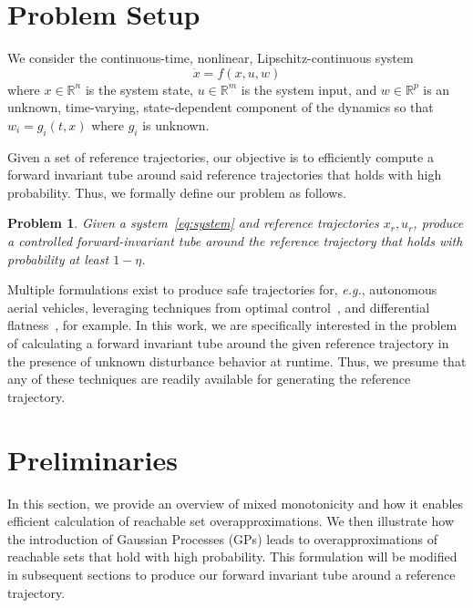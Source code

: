 \documentclass[preprint,12pt]{elsarticle}
\newcommand{\ul}{\underline}
\newtheorem{problem}{Problem}
\newcommand{\ol}{\overline}
\begin{document}
\section{Problem Setup}
\label{section:problem}
We consider the continuous-time, nonlinear, Lipschitz-continuous system
\begin{equation}
    \dot{x} = f(x, u, w)
    \label{eq:system}
\end{equation}
where $x \in \mathbb{R}^n$ is the system state, 
$u \in \mathbb{R}^m$ 
is the system input,
and $w \in \mathbb{R}^p$ is an unknown, time-varying, state-dependent component of the dynamics so that $w_i=g_i(t, x)$ where $g_i$ is unknown. 


Given a set of reference trajectories, our objective is to efficiently compute a forward invariant tube around said reference trajectories that holds with high probability. Thus, we formally define our problem as follows.

\begin{problem}
Given a system~\eqref{eq:system} and reference trajectories $x_r, u_r$, produce a controlled forward-invariant tube around the reference trajectory that holds with probability at least $1-\eta$.
\label{prob}
\end{problem}

Multiple formulations exist to produce safe trajectories for, \emph{e.g.},  autonomous aerial vehicles, leveraging techniques from optimal control~\cite{heidari2021trajectory, HEHNtraj}, and differential flatness~\cite{murray1995differential, ChamseddineQuadrotor}, for example.
In this work, we are specifically interested in the problem of calculating a forward invariant tube around the given reference trajectory in the presence of unknown disturbance behavior at runtime. Thus, we presume that any of these techniques are readily available for generating the reference trajectory.

\section{Preliminaries}
\label{section:prelim}
In this section, we provide an overview of mixed monotonicity and how it enables efficient calculation of reachable set overapproximations. We then illustrate how the introduction of Gaussian Processes (GPs) leads to overapproximations of reachable sets that hold with high probability. This formulation will be modified in subsequent sections to produce our forward invariant tube around a reference trajectory.
\end{document}
